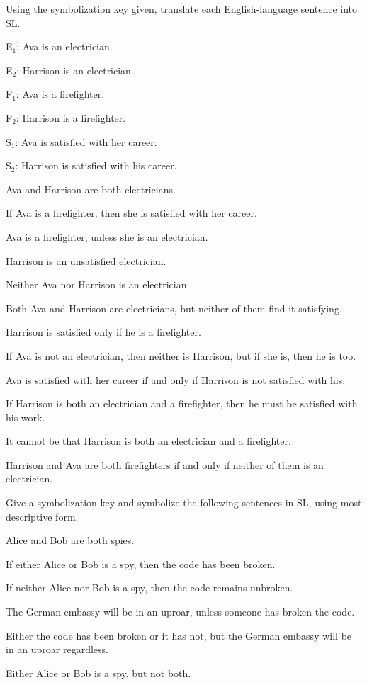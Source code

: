 \solutions
\problempart Using the symbolization key given, translate each English-language sentence into SL.
\label{pr.avacareer}
\begin{ekey}
\item[E$_1$:] Ava is an electrician.
\item[E$_2$:] Harrison is an electrician.
\item[F$_1$:] Ava is a firefighter.
\item[F$_2$:] Harrison is a firefighter.
\item[S$_1$:] Ava is satisfied with her career.
\item[S$_2$:] Harrison is satisfied with his career.
\end{ekey}
\begin{earg}
\item Ava and Harrison are both electricians.
\item If Ava is a firefighter, then she is satisfied with her career.
\item Ava is a firefighter, unless she is an electrician.
\item Harrison is an unsatisfied electrician.
\item Neither Ava nor Harrison is an electrician.
\item Both Ava and Harrison are electricians, but neither of them find it satisfying.
\item Harrison is satisfied only if he is a firefighter.
\item If Ava is not an electrician, then neither is Harrison, but if she is, then he is too.
\item Ava is satisfied with her career if and only if Harrison is not satisfied with his.
\item If Harrison is both an electrician and a firefighter, then he must be satisfied with his work.
\item It cannot be that Harrison is both an electrician and a firefighter.
\item Harrison and Ava are both firefighters if and only if neither of them is an electrician.
\end{earg}




\solutions
\problempart
\label{pr.spies}
Give a symbolization key and symbolize the following sentences in SL, using most descriptive form.
\begin{earg}
\item Alice and Bob are both spies.
\item If either Alice or Bob is a spy, then the code has been broken.
\item If neither Alice nor Bob is a spy, then the code remains unbroken.
\item The German embassy will be in an uproar, unless someone has broken the code.
\item Either the code has been broken or it has not, but the German embassy will be in an uproar regardless.
\item Either Alice or Bob is a spy, but not both.
\end{earg}

